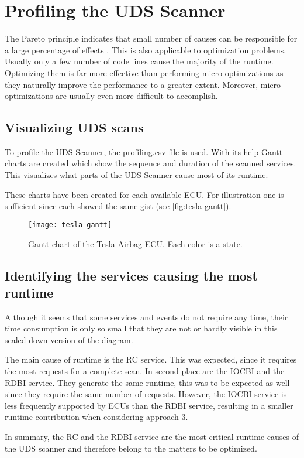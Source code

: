 \section{Profiling the UDS Scanner}

The Pareto principle indicates that small number of causes can be responsible for a large percentage of effects \cite{pareto}. This is also applicable to optimization problems. Usually only a few number of code lines cause the majority of the runtime. Optimizing them is far more effective than performing micro-optimizations as they naturally improve the performance to a greater extent. Moreover, micro-optimizations are usually even more difficult to accomplish.

\subsection{Visualizing UDS scans}

To profile the UDS Scanner, the profiling.csv file is used. With its help Gantt charts are created which show the sequence and duration of the scanned services. This visualizes what parts of the UDS Scanner cause most of its runtime.

These charts have been created for each available ECU. For illustration one is sufficient since each showed the same gist (see \autoref{fig:tesla-gantt}).

\begin{figure}[H]
    \centering
    \texttt{[image: tesla-gantt]}
    \caption{Gantt chart of the Tesla-Airbag-ECU. Each color is a state.}
    \label{fig:tesla-gantt}
\end{figure}


\subsection{Identifying the services causing the most runtime}

Although it seems that some services and events do not require any time, their time consumption is only so small that they are not or hardly visible in this scaled-down version of the diagram.

The main cause of runtime is the RC service. This was expected, since it requires the most requests for a complete scan.
In second place are the IOCBI and the RDBI service. They generate the same runtime, this was to be expected as well since they require the same number of requests. However, the IOCBI service is less frequently supported by ECUs than the RDBI service, resulting in a smaller runtime contribution when considering approach 3.

In summary, the RC and the RDBI service are the most critical runtime causes of the UDS scanner and therefore belong to the matters to be optimized.
